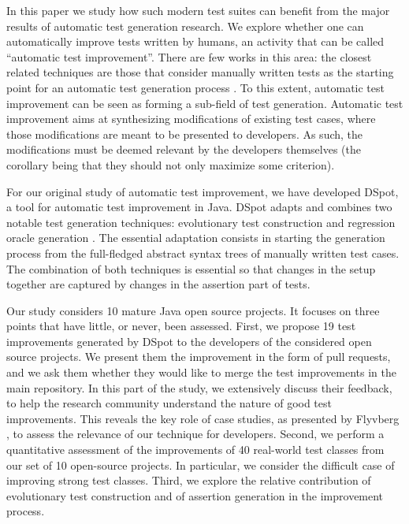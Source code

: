 \documentclass[table,xcdraw,smallextended]{svjour3}
\newcommand{\dspot}{DSpot\xspace}
\begin{document}
In this paper we study how such modern test suites can benefit from the major results of automatic test generation research.
We explore whether one can automatically improve tests written by humans, an activity that can be called ``automatic test improvement''. 
There are few works in this area: the closest related techniques are those that consider manually written tests as the starting point for an automatic test generation process \cite{Harder03,fraser2012seed,Xuan:2014:TCP:2635868.2635906,Yoo:2012:TDR:2237756.2237758,danglot2017emerging,Xuan:2015:CRV:2786805.2803206}. To this extent, automatic test improvement can be seen as forming a sub-field of test generation.
Automatic test improvement aims at synthesizing modifications of existing test cases, where those modifications are meant to be presented to developers. As such, the modifications must be deemed relevant by the developers themselves (the corollary being that they should not only maximize some criterion). 

For our original study of automatic test improvement, we have developed \dspot, a tool for automatic test improvement in Java.  \dspot  adapts and combines two notable test generation techniques: evolutionary test construction \cite{tonella} and regression oracle generation \cite{Xie2006}. The essential adaptation consists in starting the generation process from the full-fledged abstract syntax trees of manually written test cases. The combination of both techniques is essential so that changes in the setup together are captured by changes in the assertion part of tests. 

Our study considers 10 mature Java open source projects. It focuses  on three points that have little, or never, been assessed. First, we propose 19 test improvements  generated by \dspot to the developers of the considered open source projects. We present them  the improvement in the form of pull requests, and we ask them whether they would like to merge the test improvements in the main repository. In this part of the study, we extensively discuss their feedback, to help the research community understand the nature of good test improvements. This reveals the key role of case studies, as presented by Flyvberg \cite{flyvbjerg2006}, to assess the relevance of our technique for developers.
Second, we perform a quantitative assessment of the improvements of 40 real-world test classes from our set of 10 open-source projects. In particular, we consider the difficult case of improving strong test classes.
Third, we explore the relative contribution of evolutionary test construction and of assertion generation in the improvement process.
\end{document}
